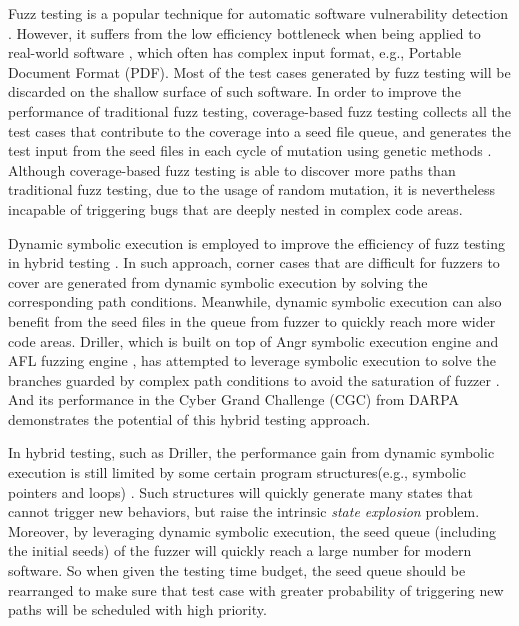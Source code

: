

Fuzz testing is a popular technique for automatic software vulnerability detection 
 \cite{Miller:Fuzz, 5010257, sutton2007fuzzing}.
 However, it suffers from the low efficiency bottleneck when being applied to real-world software 
 \cite{neystadt2008automated, godefroid2008automating, ganesh2009taint, cadar2011symbolic, rawat2017vuzzer, stephens2016driller},
  which often has complex input format, e.g., Portable Document Format (PDF).
  Most of the test cases generated by fuzz testing will be discarded on the shallow surface of such software.
  In order to improve the performance of traditional fuzz testing, 
  coverage-based fuzz testing collects all the test cases that contribute to the coverage into a seed file queue,
  and generates the test input from the seed files in each cycle of mutation using genetic methods
  \cite{rawat2017vuzzer, online:afl, stephens2016driller}.
  Although coverage-based fuzz testing is able to discover more paths than traditional fuzz testing, 
  due to the usage of random mutation,
  it is nevertheless incapable of triggering bugs that are deeply nested in complex code areas.

Dynamic symbolic execution is employed to improve the efficiency of fuzz testing in hybrid testing \cite{godefroid2012sage, yeh2015craxfuzz, majumdar2007hybrid, pak2012hybrid}.
 In such approach, corner cases that are difficult for fuzzers to cover are generated from dynamic symbolic execution by solving the corresponding path conditions.
 Meanwhile, dynamic symbolic execution can also benefit from the seed files in the queue from fuzzer 
 to quickly reach more wider code areas. 
 Driller, which is built on top of Angr symbolic execution engine \cite{Shoshitaishvili_firmalice-automatic} and AFL fuzzing engine \cite{online:afl}, 
 has attempted to leverage symbolic execution to solve the branches guarded 
 by complex path conditions to avoid the saturation of fuzzer \cite{stephens2016driller}. 
 And its performance in the Cyber Grand Challenge (CGC) from DARPA \cite{online:CGC} demonstrates the potential of this hybrid testing approach.


In hybrid testing, such as Driller, the performance gain from dynamic symbolic execution is still limited 
 by some certain program structures(e.g., symbolic pointers and loops) \cite{schwartz2010all, Boonstoppel:RAP, cadar2011symbolic, baldoni2016survey}. 
 Such structures will quickly generate many states that cannot trigger new behaviors,
 but raise the intrinsic \textit{state explosion} problem.
 Moreover, by leveraging dynamic symbolic execution, 
 the seed queue (including the initial seeds) of the fuzzer will quickly reach a large number for modern software. 
 So when given the testing time budget, the seed queue should be rearranged to make sure 
 that test case with greater probability of triggering new paths will be scheduled with high priority.


